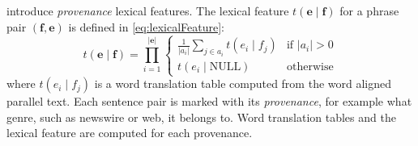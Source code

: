 \citet{chiang-deneefe-pust:2011:ACL} introduce \emph{provenance} lexical features.
The lexical feature $t(\bm{e} \mid \bm{f})$ for a phrase
pair $(\bm{f}, \bm{e})$ is defined in \autoref{eq:lexicalFeature}:
%
\begin{equation}
  t(\bm{e} \mid \bm{f}) = \prod_{i = 1}^{|\bm{e}|}
  \begin{cases}
    \frac{1}{|a_i|} \sum_{j \in a_i} t(e_i \mid f_j) & \text{if } |a_i| > 0 \\
    t(e_i \mid \text{NULL}) & \text{otherwise}
  \end{cases}
  \label{eq:lexicalFeature}
\end{equation}
%
where $t(e_i \mid f_j)$ is a word translation table computed from the
word aligned parallel text. Each sentence pair is marked with
its \emph{provenance}, for example what genre, such as newswire
or web, it belongs to. Word translation tables and the
lexical feature are computed for each provenance.

